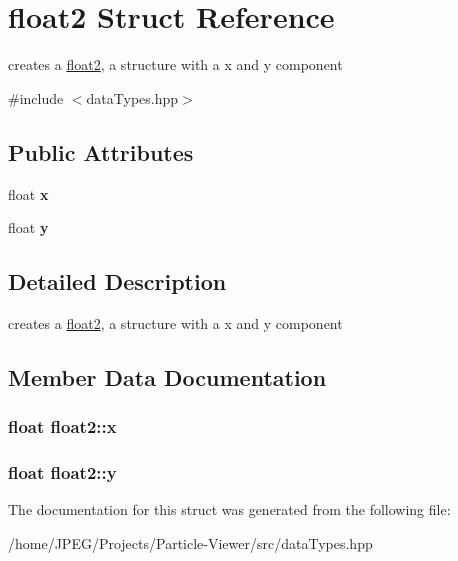 \hypertarget{structfloat2}{}\section{float2 Struct Reference}
\label{structfloat2}


creates a \hyperlink{structfloat2}{float2}, a structure with a x and y component  




{\ttfamily \#include $<$data\+Types.\+hpp$>$}

\subsection*{Public Attributes}
\begin{DoxyCompactItemize}
\item 
\hypertarget{structfloat2_a0bb68b4a8de04ffea5f7aae53c48a613}{}float {\bfseries x}\label{structfloat2_a0bb68b4a8de04ffea5f7aae53c48a613}

\item 
\hypertarget{structfloat2_a0f1298f22c4ee20a369cd3b9c25b2cc6}{}float {\bfseries y}\label{structfloat2_a0f1298f22c4ee20a369cd3b9c25b2cc6}

\end{DoxyCompactItemize}


\subsection{Detailed Description}
creates a \hyperlink{structfloat2}{float2}, a structure with a x and y component 

\subsection{Member Data Documentation}
\hypertarget{structfloat2_a0bb68b4a8de04ffea5f7aae53c48a613}{}
\subsubsection[{x}]{\setlength{\rightskip}{0pt plus 5cm}float float2\+::x}\label{structfloat2_a0bb68b4a8de04ffea5f7aae53c48a613}
\hypertarget{structfloat2_a0f1298f22c4ee20a369cd3b9c25b2cc6}{}
\subsubsection[{y}]{\setlength{\rightskip}{0pt plus 5cm}float float2\+::y}\label{structfloat2_a0f1298f22c4ee20a369cd3b9c25b2cc6}


The documentation for this struct was generated from the following file\+:\begin{DoxyCompactItemize}
\item 
/home/\+J\+P\+E\+G/\+Projects/\+Particle-\/\+Viewer/src/data\+Types.\+hpp\end{DoxyCompactItemize}
